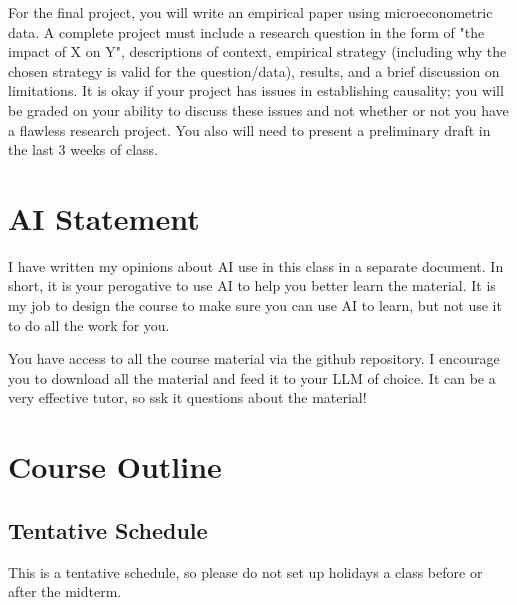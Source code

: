 \documentclass[12pt]{article}
\begin{document}
For the ﬁnal project, you will write an empirical paper using microeconometric data. 
A complete project must include a research question in the form of "the impact of X on Y", descriptions of context, empirical strategy (including why the chosen strategy is valid for the question/data), results, and a brief discussion on limitations. 
It is okay if your project has issues in establishing causality; you will be graded on your ability to discuss these issues and not whether or not you have a flawless research project.
You also will need to present a preliminary draft in the last 3 weeks of class.



\section*{AI Statement}

I have written my opinions about AI use in this class in a separate document. 
In short, it is your perogative to use AI to help you better learn the material.
It is my job to design the course to make sure you can use AI to learn, but not use it to do all the work for you. 

You have access to all the course material via the github repository. 
I encourage you to download all the material and feed it to your LLM of choice. 
It can be a very effective tutor, so ssk it questions about the material!



\section*{Course Outline}

\subsection*{Tentative Schedule}

This is a tentative schedule, so please do not set up holidays a class before or after the midterm. 

\begin{landscape}
  
\end{landscape}
\end{document}
